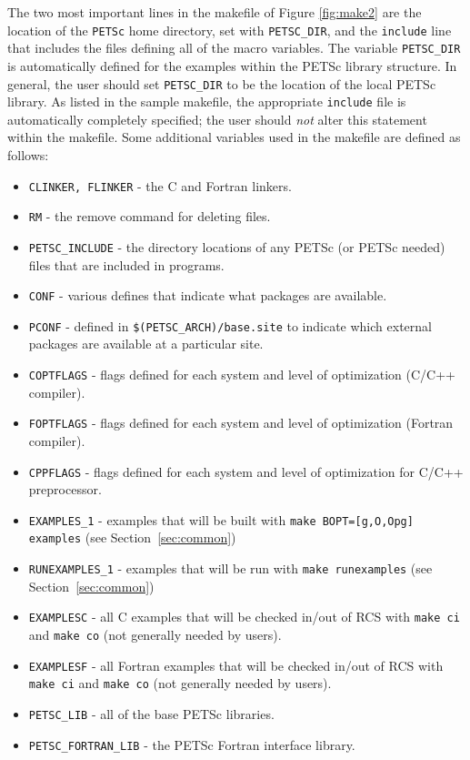 The two most important lines in the makefile of Figure \ref{fig:make2}
are the location of the {\tt PETSc} home directory, set with {\tt PETSC\_DIR}, 
and the {\tt include} line that includes the files
defining all of the macro variables. The variable {\tt PETSC\_DIR} is
automatically defined for the examples within the PETSc library 
structure.  In general, the user should set {\tt PETSC\_DIR} 
to  be the location of the local
PETSc library.  As listed in the sample makefile, the appropriate
{\tt include} file is automatically completely specified; the user should
{\em not} alter this statement within the makefile.  Some additional
variables used in the makefile are defined as follows:
\begin{itemize}
\item {\tt CLINKER, FLINKER} - the C and Fortran linkers. 
\item {\tt RM} - the remove command for deleting files.
\item {\tt PETSC\_INCLUDE} - the directory locations of any PETSc (or PETSc
            needed) files that are included in programs. 
\item {\tt CONF} - various defines that indicate what packages are available.
\item {\tt PCONF} - defined in {\tt \$(PETSC\_ARCH)/base.site} to 
            indicate which external packages are available at a particular site.
\item {\tt COPTFLAGS} - flags defined for each system and level of 
                        optimization (C/C++ compiler).
\item {\tt FOPTFLAGS} - flags defined for each system and level of 
                        optimization (Fortran compiler).
\item {\tt CPPFLAGS} - flags defined for each system and level of 
                        optimization for C/C++ preprocessor.
\item {\tt EXAMPLES\_1} - examples that will be built with
             {\tt make BOPT=[g,O,Opg] examples} (see Section~\ref{sec:common})
\item {\tt RUNEXAMPLES\_1} - examples that will be run with
             {\tt make runexamples} (see Section~\ref{sec:common})
\item {\tt EXAMPLESC} - all C examples that will be checked in/out of RCS
             with {\tt make ci} and {\tt make co} (not generally
             needed by users).
\item {\tt EXAMPLESF} - all Fortran examples that will be checked in/out of
             RCS with {\tt make ci} and {\tt make co} (not generally
             needed by users).
\item {\tt PETSC\_LIB} - all of the base PETSc libraries.
\item {\tt PETSC\_FORTRAN\_LIB} - the PETSc Fortran interface 
             library. 
\end{itemize}
